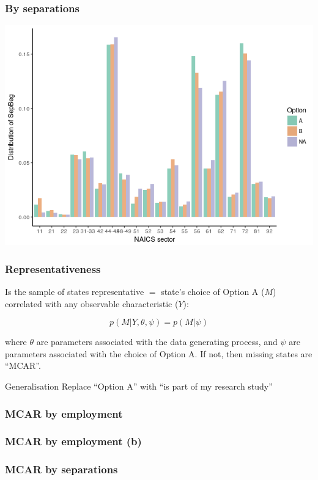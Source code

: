 \documentclass[aspectratio=169]{beamer}
\begin{document}
\begin{frame}
	\frametitle{By separations}
	\centering
	\includegraphics[height=0.9\textheight]{graph_SepBeg-1.png}
\end{frame}




\begin{frame}
\frametitle{Representativeness}
Is the sample of states representative $=$ state's choice of Option A ($M$)  correlated with any observable characteristic ($Y$):

$$p(M | Y, \theta, \psi) = p(M|\psi)$$

where $\theta$ are parameters associated with the data generating process, and $\psi$ are parameters associated with the choice of Option A. If not, then missing states are ``\ac{MCAR}''. 
\begin{block}{Generalisation}
	Replace ``Option A'' with ``is part of my research study''
\end{block}
\end{frame}


\begin{frame}
\frametitle{MCAR by employment}
\small \centering

\end{frame}


\begin{frame}
\frametitle{MCAR by employment (b)}
\small \centering

\end{frame}

\begin{frame}
	\frametitle{MCAR by separations}
	\small \centering
	
\end{frame}
\end{document}
